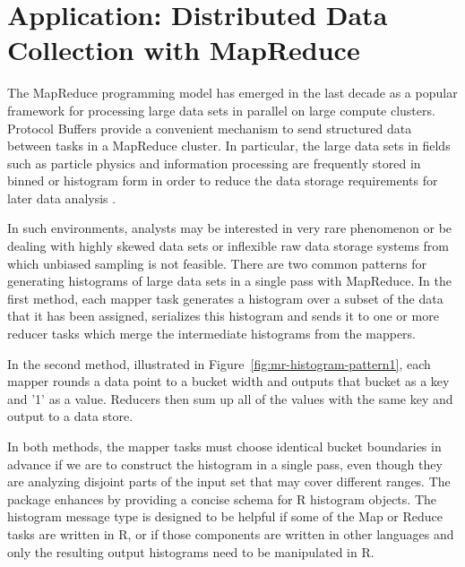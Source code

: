 \documentclass[article]{jss}
\begin{document}
\section{Application: Distributed Data Collection with MapReduce}

The MapReduce programming model \citep{dean2008mapreduce} has emerged
in the last decade as a popular framework for processing large data
sets in parallel on large compute clusters.  Protocol Buffers
provide a convenient mechanism to send structured data between tasks
in a MapReduce cluster.  In particular, the large data sets in fields
such as particle physics and information processing are frequently
stored in binned or histogram form in order to reduce the data storage
requirements for later data analysis \citep{scott2009multivariate}.

In such environments, analysts may be interested in very rare
phenomenon or be dealing with highly skewed data sets or inflexible
raw data storage systems from which unbiased sampling is not feasible.
There are two common patterns for generating histograms of large data
sets in a single pass with MapReduce.  In the first method, each
mapper task generates a histogram over a subset of the data that it
has been assigned, serializes this histogram and sends it to one or
more reducer tasks which merge the intermediate histograms from the
mappers.

In the second method, illustrated in
Figure~\ref{fig:mr-histogram-pattern1}, each mapper rounds a data
point to a bucket width and outputs that bucket as a key and '1' as a
value.  Reducers then sum up all of the values with the same key and
output to a data store.

In both methods, the mapper tasks must choose identical bucket
boundaries in advance if we are to construct the histogram in a single
pass, even though they are analyzing disjoint parts of the input set
that may cover different ranges.  The  package
\citep{histogramtools} enhances  by providing a concise
schema for R histogram objects.  The histogram message type is
designed to be helpful if some of the Map or Reduce tasks are written
in R, or if those components are written in other languages and only
the resulting output histograms need to be manipulated in R.
\end{document}
